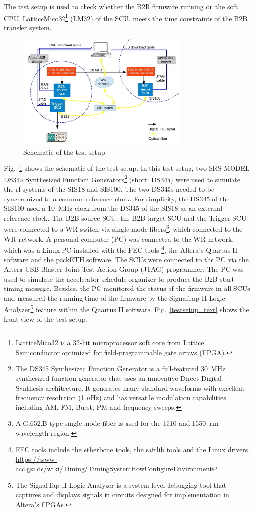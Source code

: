 The test setup is used to check whether the B2B firmware running on the soft CPU, LatticeMico32\footnote{LatticeMico32 is a 32-bit microprocessor soft core from Lattice Semiconductor optimized for field-programmable gate arrays (FPGA).} (LM32) of the SCU, meets the time constraints of the B2B transfer system.  

\begin{figure}[!htb]
   \centering   
   \includegraphics*[width=85mm]{schematic_setup.jpg}
   \caption{Schematic of the test setup.}
   \label{setup}
\end{figure}
Fig.~\ref{setup} shows the schematic of the test setup. In this test setup, two SRS MODEL DS345 Synthesized Function Generators\footnote{The DS345 Synthesized Function Generator is a full-featured \SI{30}{\MHz} synthesized function generator that uses an innovative Direct Digital Synthesis architecture. It generates many standard waveforms with excellent frequency resolution (1 $\mu$Hz) and has versatile modulation capabilities including AM, FM, Burst, PM and frequency sweeps.} (short: DS345) were used to simulate the rf systems of the SIS18 and SIS100. The two DS345s needed to be synchronized to a common reference clock. For simplicity, the DS345 of the SIS100 used a \SI{10}{\MHz} clock from the DS345 of the SIS18 as an external reference clock. The B2B source SCU, the B2B target SCU and the Trigger SCU were connected to a WR switch via single mode fibers\footnote{A G.652.B type single mode fiber is used for the 1310 and \SI{1550}{nm} wavelength region.}, which connected to the WR network. A personal computer (PC) was connected to the WR network, which was a Linux PC installed with the FEC tools \footnote{FEC tools include the etherbone tools, the saftlib tools and the Linux drivers. \\ \url{https://www-acc.gsi.de/wiki/Timing/TimingSystemHowConfigureEnvironment}}, the Altera's Quartus II software and the packETH software. The SCUs were connected to the PC via the Altera USB-Blaster Joint Test Action Group (JTAG) programmer. The PC was used to simulate the accelerator schedule organizer to produce the B2B start timing message. Besides, the PC monitored the status of the firmware in all SCUs and measured the running time of the firmware by the SignalTap II Logic Analyzer\footnote{The SignalTap II Logic Analyzer is a system-level debugging tool that captures and displays signals in circuits designed for implementation in Altera’s FPGAs.} feature within the Quartus II software. Fig.~\ref{testsetup_text} shows the front view of the test setup. 
